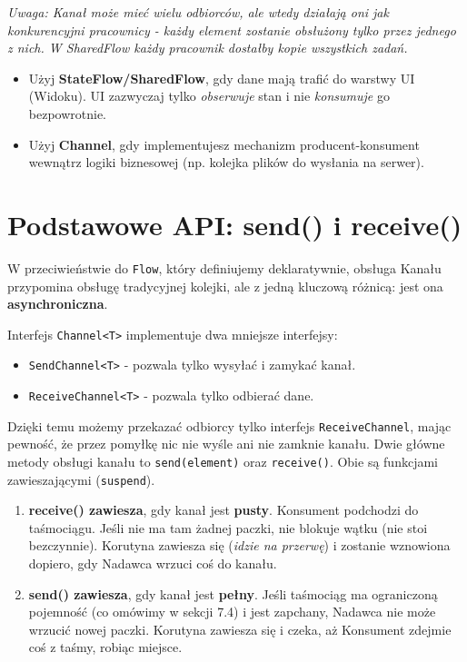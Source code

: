 \textit{Uwaga: Kanał może mieć wielu odbiorców, ale wtedy działają oni jak konkurencyjni pracownicy - każdy element zostanie obsłużony tylko przez jednego z nich. W SharedFlow każdy pracownik dostałby kopie wszystkich zadań.}

\begin{itemize}
    \item Użyj \textbf{StateFlow/SharedFlow}, gdy dane mają trafić do warstwy UI (Widoku). UI zazwyczaj tylko \textit{obserwuje} stan i nie \textit{konsumuje} go bezpowrotnie.
    \item Użyj \textbf{Channel}, gdy implementujesz mechanizm producent-konsument wewnątrz logiki biznesowej (np. kolejka plików do wysłania na serwer).
\end{itemize}

\section{Podstawowe API: send() i receive()}

W przeciwieństwie do \texttt{Flow}, który definiujemy deklaratywnie, obsługa Kanału przypomina obsługę tradycyjnej kolejki, ale z jedną kluczową różnicą: jest ona \textbf{asynchroniczna}.

Interfejs \texttt{Channel<T>} implementuje dwa mniejsze interfejsy:
\begin{itemize}
    \item \texttt{SendChannel<T>} - pozwala tylko wysyłać i zamykać kanał.
    \item \texttt{ReceiveChannel<T>} - pozwala tylko odbierać dane.
\end{itemize}

Dzięki temu możemy przekazać odbiorcy tylko interfejs \texttt{ReceiveChannel}, mając pewność, że przez pomyłkę nic nie wyśle ani nie zamknie kanału. Dwie główne metody obsługi kanału to \texttt{send(element)} oraz \texttt{receive()}. Obie są funkcjami zawieszającymi (\texttt{suspend}).

\begin{enumerate}
    \item \textbf{receive() zawiesza}, gdy kanał jest \textbf{pusty}.
    Konsument podchodzi do taśmociągu. Jeśli nie ma tam żadnej paczki, nie blokuje wątku (nie stoi bezczynnie). Korutyna zawiesza się (\textit{idzie na przerwę}) i zostanie wznowiona dopiero, gdy Nadawca wrzuci coś do kanału.

    \item \textbf{send() zawiesza}, gdy kanał jest \textbf{pełny}.
    Jeśli taśmociąg ma ograniczoną pojemność (co omówimy w sekcji 7.4) i jest zapchany, Nadawca nie może wrzucić nowej paczki. Korutyna zawiesza się i czeka, aż Konsument zdejmie coś z taśmy, robiąc miejsce.
\end{enumerate}


